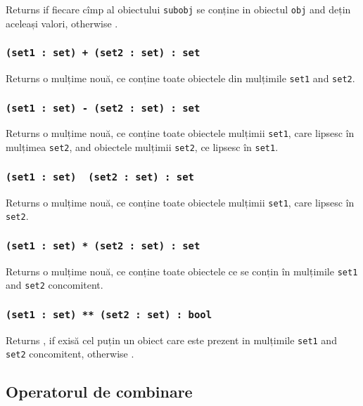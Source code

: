 Returns \false{} if fiecare cîmp al obiectului \texttt{subobj} se conține in obiectul \texttt{obj} and dețin aceleași valori, otherwise \true{}.

\subsubsection{\texttt{(set1 : set) + (set2 : set) : set}}

Returns o mulțime nouă, ce conține toate obiectele din mulțimile \texttt{set1} and \texttt{set2}.

\subsubsection{\texttt{(set1 : set) - (set2 : set) : set}}

Returns o mulțime nouă, ce conține toate obiectele mulțimii \texttt{set1}, care lipsesc în mulțimea \texttt{set2}, and obiectele mulțimii \texttt{set2}, ce lipsesc în \texttt{set1}.

\subsubsection{\texttt{(set1 : set) \ (set2 : set) : set}}

Returns o mulțime nouă, ce conține toate obiectele mulțimii \texttt{set1}, care lipsesc în \texttt{set2}.

\subsubsection{\texttt{(set1 : set) * (set2 : set) : set}}

Returns o mulțime nouă, ce conține toate obiectele ce se conțin în mulțimile \texttt{set1} and \texttt{set2} concomitent.

\subsubsection{\texttt{(set1 : set) ** (set2 : set) : bool}}

Returns \true, if exisă cel puțin un obiect care este prezent in mulțimile \texttt{set1} and \texttt{set2} concomitent, otherwise \false.

\subsection{Operatorul de combinare}

